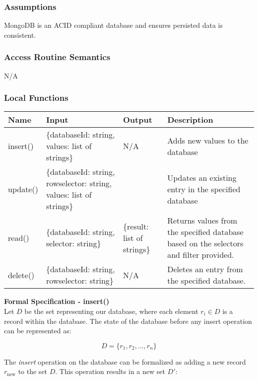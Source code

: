 \documentclass[12pt, titlepage]{article}
\begin{document}
\subsubsection{ Assumptions}

MongoDB is an ACID compliant database and ensures persisted data is consistent.

\subsubsection{ Access Routine Semantics}

N/A

\subsubsection{ Local Functions}
\begin{center}
\begin{tabular}{p{2cm} p{4cm} p{4cm} p{4cm}}
\hline
\textbf{Name} & \textbf{Input} & \textbf{Output} & \textbf{Description} \\
\hline
insert() & \{databaseId: string, values: list of strings\} & N/A & Adds new values to the database \\
\hline
update() & \{databaseId: string, rowselector: string, values: list of strings\} &  & Updates an existing entry in the specified database \\
\hline
read() & \{databaseId: string, selector: string\} & \{result: list of strings\} & Returns values from the specified database based on the selectors and filter provided. \\
\hline
delete() & \{databaseId: string, rowselector: string\} & N/A & Deletes an entry from the specified database. \\
\hline

\end{tabular}

\end{center}

\textbf{Formal Specification - insert()}\\
Let $D$ be the set representing our database, where each element $r_i \in D$ is a record within the database. The state of the database before any insert operation can be represented as:

\[
D = \{r_1, r_2, \ldots, r_n\}
\]

The \textit{insert} operation on the database can be formalized as adding a new record $r_{\text{new}}$ to the set $D$. This operation results in a new set $D'$:
\end{document}
